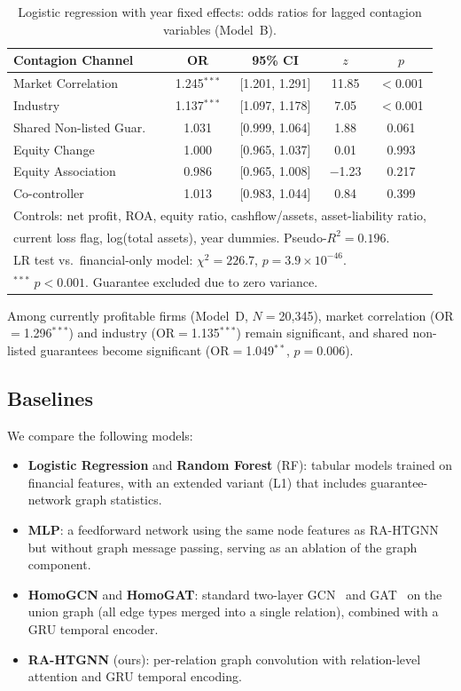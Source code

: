 \documentclass[3p,times,procedia]{elsarticle}
\begin{document}
\begin{table}[htbp]
\centering
\caption{Logistic regression with year fixed effects: odds ratios for lagged contagion variables (Model~B).}\label{tab:logistic}
\begin{tabular}{@{}lcccc@{}}
\toprule
Contagion Channel & OR & 95\% CI & $z$ & $p$ \\
\midrule
Market Correlation & 1.245$^{***}$ & [1.201, 1.291] & 11.85 & $<$0.001 \\
Industry & 1.137$^{***}$ & [1.097, 1.178] & 7.05 & $<$0.001 \\
Shared Non-listed Guar. & 1.031 & [0.999, 1.064] & 1.88 & 0.061 \\
Equity Change & 1.000 & [0.965, 1.037] & 0.01 & 0.993 \\
Equity Association & 0.986 & [0.965, 1.008] & $-$1.23 & 0.217 \\
Co-controller & 1.013 & [0.983, 1.044] & 0.84 & 0.399 \\
\bottomrule
\multicolumn{5}{l}{\footnotesize Controls: net profit, ROA, equity ratio, cashflow/assets, asset-liability ratio,} \\
\multicolumn{5}{l}{\footnotesize \phantom{Controls: }current loss flag, log(total assets), year dummies. Pseudo-$R^2=0.196$.} \\
\multicolumn{5}{l}{\footnotesize LR test vs.\ financial-only model: $\chi^2=226.7$, $p=3.9\times10^{-46}$.} \\
\multicolumn{5}{l}{\footnotesize $^{***}$ $p<0.001$. Guarantee excluded due to zero variance.} \\
\end{tabular}
\end{table}

Among currently profitable firms (Model~D, $N=$20{,}345), market correlation (OR$=$1.296$^{***}$) and industry (OR$=$1.135$^{***}$) remain significant, and shared non-listed guarantees become significant (OR$=$1.049$^{**}$, $p=0.006$).


\subsection{Baselines}
\label{subsec:baselines}

We compare the following models:
\begin{itemize}
\item \textbf{Logistic Regression} and \textbf{Random Forest} (RF): tabular models trained on financial features, with an extended variant (L1) that includes guarantee-network graph statistics.
\item \textbf{MLP}: a feedforward network using the same node features as RA-HTGNN but without graph message passing, serving as an ablation of the graph component.
\item \textbf{HomoGCN} and \textbf{HomoGAT}: standard two-layer GCN~\cite{kipf2017semi} and GAT~\cite{velickovic2018graph} on the union graph (all edge types merged into a single relation), combined with a GRU temporal encoder.
\item \textbf{RA-HTGNN} (ours): per-relation graph convolution with relation-level attention and GRU temporal encoding.
\end{itemize}
\end{document}
